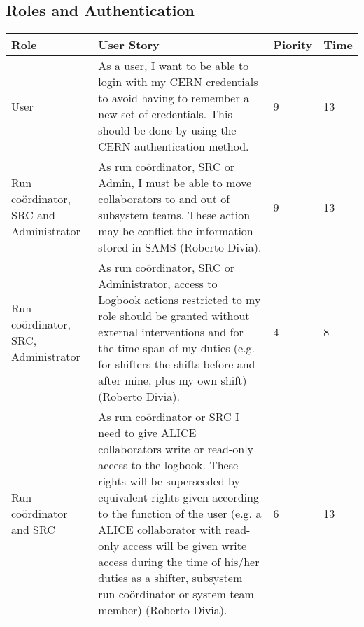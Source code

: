 \subsection{Roles and Authentication}
\begin{longtable}{ | p{2cm} | p{8cm} | p{1.5cm} | l |}
\hline
Role & User Story & Piority & Time \\ \hline
User & As a user, I want to be able to login with my CERN credentials to avoid having to remember a new set of credentials. This should be done by using the CERN authentication method. & 9 & 13 \\ \hline
Run coördinator, SRC and Administrator &  As run coördinator, SRC or Admin, I must be able to move collaborators to and out of subsystem teams. These action may be conflict the information stored in SAMS (Roberto Divia). & 9 & 13 \\ \hline
Run coördinator, SRC, Administrator & As run coördinator, SRC or Administrator, access to Logbook actions restricted to my role should be granted without external interventions and for the time span of my duties (e.g. for shifters the shifts before and after mine, plus my own shift) (Roberto Divia). &4 & 8\\ \hline
Run coördinator and SRC &  As run coördinator or SRC I need to give ALICE collaborators write or read-only access to the logbook. These rights will be superseeded by equivalent rights given according to the function of the user (e.g. a ALICE collaborator with read-only access will be given write access during the time of his/her duties as a shifter, subsystem run coördinator or system team member) (Roberto Divia).&6&13 \\ \hline
\end{longtable}
\newpage
